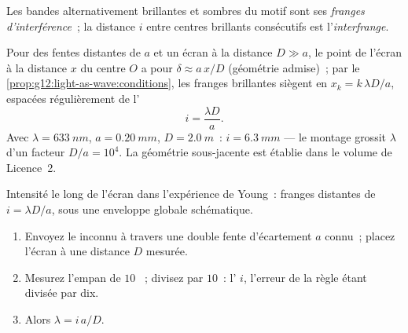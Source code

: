 \begin{definition}\label{def:g12:light-as-wave:fringes}
Les bandes alternativement brillantes et sombres du motif sont ses
\emph{franges d'interférence}~; la
distance $i$ entre centres brillants consécutifs est
l'\emph{interfrange}.
\end{definition}

\begin{proposition}[L'interfrange]\label{prop:g12:light-as-wave:interfringe}
Pour des fentes distantes de $a$ et un écran à la distance $D \gg a$,
le point de l'écran à la distance $x$ du centre $O$ a pour
 $\delta \approx a\,x/D$ (géométrie
admise)~; par le \cref{prop:g12:light-as-wave:conditions}, les franges
brillantes siègent en $x_k = k\,\lambda D/a$, espacées régulièrement
de l'
\[
i = \frac{\lambda D}{a}.
\]
Avec $\lambda = \qty{633}{nm}$, $a = \qty{0.20}{mm}$, $D =
\qty{2.0}{m}$~: $i = \qty{6.3}{mm}$ --- le montage grossit $\lambda$
d'un facteur $D/a = 10^4$. La géométrie sous-jacente est établie dans
le volume de Licence~2.
\end{proposition}
\admitted

\begin{omfigure}

{\small Intensité le long de l'écran dans l'expérience de Young~:
franges distantes de $i = \lambda D/a$, sous une enveloppe globale
schématique.}
\end{omfigure}

\begin{method}\label{met:g12:light-as-wave:lambda}
\begin{enumerate}
  \item Envoyez le  inconnu à travers une double fente
        d'écartement $a$ connu~; placez l'écran à une distance $D$
        mesurée.
  \item Mesurez l'empan de $10$ ~; divisez par
        $10$~: l' $i$, l'erreur de la règle étant
        divisée par dix.
  \item Alors $\lambda = i\,a/D$.
\end{enumerate}
\end{method}


